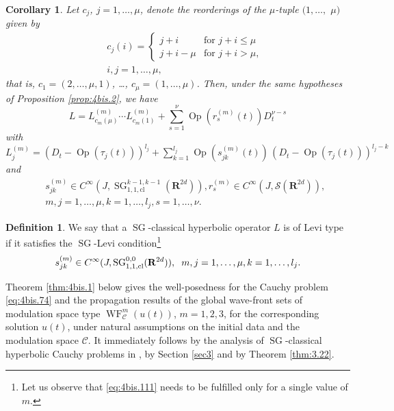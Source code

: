 \documentclass[12pt,a4paper,reqno]{amsart}
\numberwithin{equation}{section}
\numberwithin{thm}{section}
\newtheorem{cor}[thm]{Corollary}
\theoremstyle{definition}
\newtheorem{defn}[thm]{Definition}
\theoremstyle{remark}
\begin{document}
\begin{cor}
    \label{cor:4bis.3}
    Let $c_{j}$, $j=1, \dots, \mu$, denote the reorderings of the
    $\mu$-tuple $(1, \dots,$ $\mu)$ given by
        \begin{eqnarray*}
	& &
	c_{j}(i) =
	\left\{
	\begin{array}{ll}
	    j + i       & \mbox{for $j + i \le \mu$}
	    \\
	    j + i - \mu & \mbox{for $j + i  >  \mu$},
	\end{array}
	\right.
	\\
	& &
	i, j = 1, \dots, \mu,
    \end{eqnarray*}
        that is, $c_{1} = (2, \dots, \mu, 1)$, \dots,
    $c_{\mu} = (1, \dots, \mu)$. Then, under the same hypotheses of
    Proposition \ref{prop:4bis.2}, we have
        \[
    L = L^{(m)}_{c_{m}(\mu)} \cdots L^{(m)}_{c_{m}(1)} +
	\sum_{s=1}^\nu {\operatorname{Op}({r^{(m)}_{s}(t)})} D_{t}^{\nu-s}
    \]
        with $L^{(m)}_{j}= (D_{t} - {\operatorname{Op}({\tau_j(t)})})^{l_{j}} + \sum_{k=1}^{l_{j}}
             {\operatorname{Op}({s^{(m)}_{jk}(t)})} \, (D_{t} - {\operatorname{Op}({\tau_j(t)})})^{l_{j}-k}$ and
        \begin{eqnarray*}
	& &
	s^{(m)}_{jk} \in C^\infty(J, {\operatorname{SG}}^{k-1, k-1}_{1,1,\mathrm{cl}}({\mathbf R^{{2d}}})),
	r^{(m)}_{s} \in C^\infty(J,{{\mathscr S}}({\mathbf R^{{2d}}})),
	\\
	& &
	m,j=1, \dots, \mu, k = 1, \dots, l_{j}, s= 1, \dots, \nu.
    \end{eqnarray*}
    \end{cor}
\begin{defn}
We say that a ${\operatorname{SG}}$-classical hyperbolic operator 
$L$ is of Levi type if it satisfies the ${\operatorname{SG}}$-Levi
condition\footnote{Let us observe that \eqref{eq:4bis.111} needs to be
fulfilled only for a single value of $m$.}
\begin{equation}
    \label{eq:4bis.111}
    s^{(m)}_{jk} \in C^\infty(J, {\operatorname{SG}}^{0,0}_{1,1,\mathrm{cl}}({\mathbf R^{{2d}}})),
    \hspace{0.2cm}
    m,j=1, \dots, \mu,
    k=1, \dots, l_{j}.
\end{equation}
\end{defn}
Theorem \ref{thm:4bis.1} below gives the well-posedness for the Cauchy problem
\eqref{eq:4bis.74} and the propagation results of the global wave-front sets of modulation
space type ${\operatorname{WF}}^m_{{\mathcal C}}(u(t))$, $m=1,2,3$, for the corresponding solution $u(t)$, 
under natural assumptions on the initial data and the modulation space ${{\mathcal C}}$.
It immediately follows by the analysis of ${\operatorname{SG}}$-classical hyperbolic Cauchy problems in 
\cite{CoPa}, by Section \ref{sec3} and by Theorem \ref{thm:3.22}.
\end{document}
